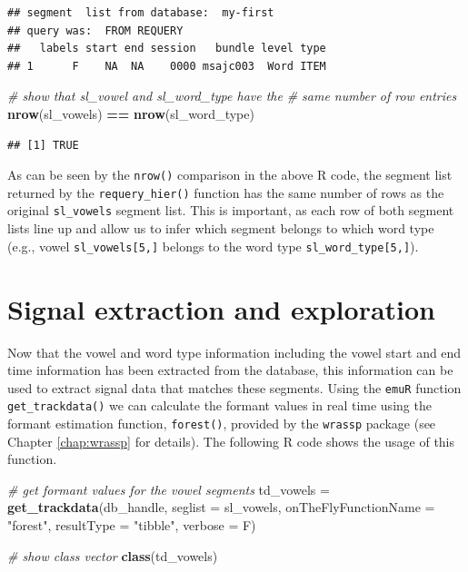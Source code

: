 \documentclass[]{book}
\newenvironment{Shaded}{\begin{snugshade}}{\end{snugshade}}
\newcommand{\CommentTok}[1]{\textcolor[rgb]{0.56,0.35,0.01}{\textit{#1}}}
\newcommand{\DataTypeTok}[1]{\textcolor[rgb]{0.13,0.29,0.53}{#1}}
\newcommand{\KeywordTok}[1]{\textcolor[rgb]{0.13,0.29,0.53}{\textbf{#1}}}
\newcommand{\NormalTok}[1]{#1}
\newcommand{\OperatorTok}[1]{\textcolor[rgb]{0.81,0.36,0.00}{\textbf{#1}}}
\newcommand{\StringTok}[1]{\textcolor[rgb]{0.31,0.60,0.02}{#1}}
\begin{document}
\begin{verbatim}
## segment  list from database:  my-first 
## query was:  FROM REQUERY 
##   labels start end session   bundle level type
## 1      F    NA  NA    0000 msajc003  Word ITEM
\end{verbatim}

\begin{Shaded}
\begin{Highlighting}[]
\CommentTok{# show that sl_vowel and sl_word_type have the}
\CommentTok{# same number of row entries}
\KeywordTok{nrow}\NormalTok{(sl_vowels) }\OperatorTok{==}\StringTok{ }\KeywordTok{nrow}\NormalTok{(sl_word_type)}
\end{Highlighting}
\end{Shaded}

\begin{verbatim}
## [1] TRUE
\end{verbatim}

As can be seen by the \texttt{nrow()} comparison in the above R code, the segment list returned by the \texttt{requery\_hier()} function has the same number of rows as the original \texttt{sl\_vowels} segment list. This is important, as each row of both segment lists line up and allow us to infer which segment belongs to which word type (e.g., vowel \texttt{sl\_vowels{[}5,{]}} belongs to the word type \texttt{sl\_word\_type{[}5,{]}}).

\hypertarget{section:tutorial-sigExtrAndExpl}{%
\section{Signal extraction and exploration}\label{section:tutorial-sigExtrAndExpl}}

Now that the vowel and word type information including the vowel start and end time information has been extracted from the database, this information can be used to extract signal data that matches these segments. Using the \texttt{emuR} function \texttt{get\_trackdata()} we can calculate the formant values in real time using the formant estimation function, \texttt{forest()}, provided by the \texttt{wrassp} package (see Chapter \ref{chap:wrassp} for details). The following R code shows the usage of this function.

\begin{Shaded}
\begin{Highlighting}[]
\CommentTok{# get formant values for the vowel segments}
\NormalTok{td_vowels =}\StringTok{ }\KeywordTok{get_trackdata}\NormalTok{(db_handle,}
                          \DataTypeTok{seglist =}\NormalTok{ sl_vowels,}
                          \DataTypeTok{onTheFlyFunctionName =} \StringTok{"forest"}\NormalTok{,}
                          \DataTypeTok{resultType =} \StringTok{"tibble"}\NormalTok{,}
                          \DataTypeTok{verbose =}\NormalTok{ F)}

\CommentTok{# show class vector}
\KeywordTok{class}\NormalTok{(td_vowels)}
\end{Highlighting}
\end{Shaded}
\end{document}

